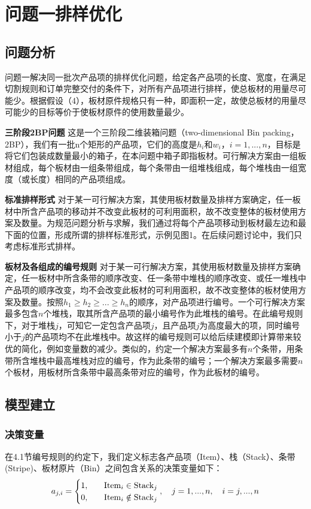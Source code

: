 \documentclass[bwprint]{gmcmthesis}
\begin{document}
\section{问题一排样优化}

\subsection{问题分析}

问题一解决同一批次产品项的排样优化问题，给定各产品项的长度、宽度，在满足切割规则和订单完整交付的条件下，对所有产品项进行排样，使总板材的用量尽可能少。根据假设（4），板材原件规格只有一种，即面积一定，故使总板材的用量尽可能少的目标等价于使板材原件的使用数量最少。

\textbf{三阶段2BP问题} \quad 这是一个三阶段二维装箱问题（two-dimensional  {\rm Bin} packing，2BP），我们有一批n个矩形的产品项，它们的高度是$h_i$和$w_i$，$i=1,...,n$，目标是将它们包装成数量最小的箱子，在本问题中箱子即指板材。可行解决方案由一组板材组成，每个板材由一组条带组成，每个条带由一组堆栈组成，每个堆栈由一组宽度（或长度）相同的产品项组成。

\textbf{标准排样形式} \quad 对于某一可行解决方案，其使用板材数量及排样方案确定，任一板材中所含产品项的移动并不改变此板材的可利用面积，故不改变整体的板材使用方案及数量。为规范问题分析与求解，我们通过将每个产品项移动到板材最左边和最下面的位置，形成所谓的排样标准形式，示例见图1。在后续问题讨论中，我们只考虑标准形式排样。

\textbf{板材及各组成的编号规则} \quad 对于某一可行解决方案，其使用板材数量及排样方案确定，任一板材中所含条带的顺序改变、任一条带中堆栈的顺序改变、或任一堆栈中产品项的顺序改变，均不会改变此板材的可利用面积，故不改变整体的板材使用方案及数量。按照$h_1 \geq h_2 \geq ...\geq h_n$的顺序，对产品项进行编号。一个可行解决方案最多包含$n$个堆栈，取其所含产品项的最小编号作为此堆栈的编号。在此编号规则下，对于堆栈$j$，可知它一定包含产品项$j$，且产品项$j$为高度最大的项，同时编号小于$j$的产品项均不在此堆栈中。故这样的编号规则可以给后续建模即计算带来较优的简化，例如变量数的减少。类似的，约定一个解决方案最多有$n$个条带，用条带所含堆栈中最高堆栈对应的编号，作为此条带的编号；一个解决方案最多需要$n$个板材，用板材所含条带中最高条带对应的编号，作为此板材的编号。


\subsection{模型建立}

\subsubsection{决策变量}
在4.1节编号规则的约定下，我们定义标志各产品项（Item）、栈（Stack）、条带(Stripe)、板材原片（Bin）之间包含关系的决策变量如下：
\begin{equation}   %
    a_{j,i}=
    \begin{cases}
        1, \quad  &  {\rm Item}_i \in   {\rm Stack}_j \\
        0,\quad  &  {\rm Item}_i  \notin   {\rm Stack}_j \\
    \end{cases},\quad j=1,...,n, \quad i=j,...,n  \label{决策变量定义a}
\end{equation}
\end{document}
